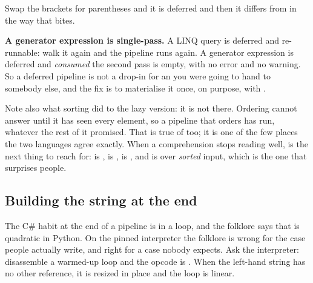 
\noindent
Swap the brackets for parentheses and it is deferred \dash{} and then it
differs from  in the way that bites.




\begin{trapbox}
\textbf{A generator expression is single-pass.} A LINQ query is deferred
and re-runnable: walk it again and the pipeline runs again. A generator
expression is deferred and \emph{consumed} \dash{} the second pass is
empty, with no error and no warning. So a deferred pipeline is not a
drop-in for an  you were going to hand to somebody else,
and the fix is to materialise it once, on purpose, with .
\end{trapbox}

\noindent
Note also what sorting did to the lazy version: it is not there. Ordering
cannot answer until it has seen every element, so a pipeline that orders
has run, whatever the rest of it promised. That is true of
 too; it is one of the few places the two languages agree
exactly. When a comprehension stops reading well,  is the
next thing to reach for:  is ,
 is ,  is , and
 is  over \emph{sorted} input, which is the one
that surprises people.

\subsection{Building the string at the end}
\label{sec:ch05-join}

The C\# habit at the end of a pipeline is \code{+=} in a loop, and the
folklore says that is quadratic in Python. On the pinned interpreter the
folklore is wrong for the case people actually write, and right for a case
nobody expects. Ask the interpreter: disassemble a warmed-up loop and the
opcode is . When the left-hand string has no
other reference, it is resized in place and the loop is linear.

